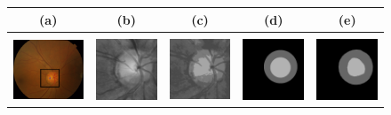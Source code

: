 \begin{figure}[!htbp]
\centering
\renewcommand{\arraystretch}{0.8}
\begin{tabular}{|c c c c c|}
	
\hline

(a) & (b) & (c) & (d) & (e) \\

\hline
{} & {} & {} & {} & {} \\

\includegraphics[width=3.5cm]{Images/Results/Results/drishti47/od_detect_frame.png} &
\includegraphics[width=3cm]{Images/Results/Results/drishti47/0_crop.png} &
\includegraphics[width=3.0cm]{Images/Results/Results/drishti47/1_kmeans.png} &
\includegraphics[width=3cm]{Images/Results/Results/drishti47/overlay.png} &
\includegraphics[width=3cm]{Images/Results/Results/drishti47/overlay_gt.png} \\


\end{tabular}
\end{figure}
